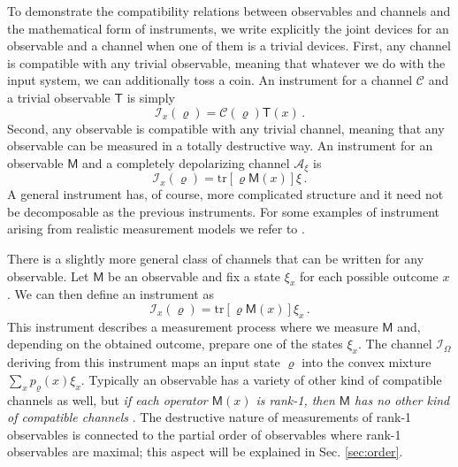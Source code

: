 \documentclass[12pt]{iopart}
\theoremstyle{definition}
\renewcommand{\tr}[1]{\textrm{tr}\left[#1\right]} %
\newcommand{\Mo}{\mathsf{M}}%
\newcommand{\To}{\mathsf{T}}%
\newcommand{\Cc}{\mathcal{C}} %
\newcommand{\Ac}{\mathcal{A}} %
\newcommand{\Ii}{\mathcal{I}}
\begin{document}
{To demonstrate the compatibility relations between observables and  channels and the mathematical form of instruments, we write explicitly the joint devices for an observable and a channel when one of them is a trivial devices.
First, any channel is compatible with any trivial observable, meaning that whatever we do with the input system, we can additionally toss a coin.
An instrument for a channel $\Cc$ and a trivial observable $\To$ is simply
\begin{equation}\label{eq:instrument-trivial}
\Ii_x(\varrho)= \Cc(\varrho) \To(x) \, .
\end{equation}
Second, any observable is compatible with any trivial channel, meaning that any observable can be measured in a totally destructive way.
An instrument for an observable $\Mo$ and a completely depolarizing channel $\Ac_\xi$ is
\begin{equation}\label{eq:instrument-with-dc}
\Ii_x(\varrho)= \tr{\varrho \Mo(x)} \xi \, .
\end{equation}
A general instrument has, of course, more complicated structure and it need not be decomposable as the previous instruments.
For some examples of instrument arising from realistic measurement models we refer to \cite{OQP97}.  

There is a slightly more general class of channels that can be written for any observable. 
Let $\Mo$ be an observable and fix a state $\xi_x$ for each possible outcome $x$.
We can then define an instrument as
\begin{equation}
\Ii_x(\varrho)= \tr{\varrho \Mo(x)} \xi_x \, .
\end{equation}
This instrument describes a measurement process where we measure  $\Mo$ and, depending on the obtained outcome, prepare one of the states $\xi_x$.
The channel $\Ii_\Omega$ deriving from this instrument maps an input state $\varrho$ into the convex mixture $\sum_x p_\varrho(x) \xi_x$.
Typically an observable has a variety of other kind of compatible channels as well, but \emph{if each operator $\Mo(x)$ is rank-1, then $\Mo$ has no other kind of compatible channels} \cite{HeWo10}.
The destructive nature of measurements of rank-1 observables is connected to the partial order of observables where rank-1 observables are maximal; this aspect will be explained in Sec. \ref{sec:order}.

}
\end{document}
